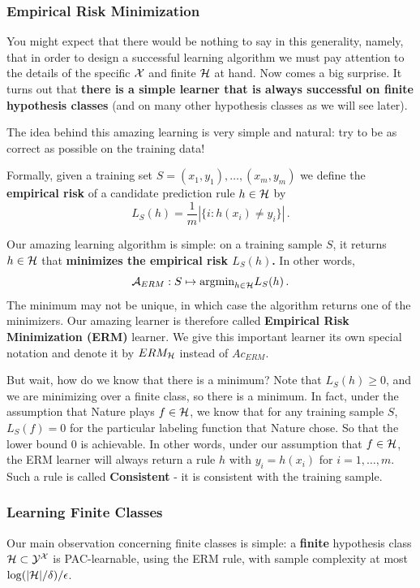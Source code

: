 {\subsubsection{Empirical Risk Minimization}

You might expect that there would be nothing to say in this generality, namely,
that in order to design a successful learning algorithm we must pay attention to
the details of the specific $\mathcal{X}$ and finite $\mathcal{H}$ at hand.
Now comes a big surprise. It turns out that {\bf there is a simple learner that is always successful on finite hypothesis classes} (and on many other hypothesis classes as we will see later).

The idea behind this amazing learning is very simple and natural: try to be as correct as possible on the training data!

Formally, given  a training set $S = (x_1,y_1),\ldots,(x_m,y_m)$ we define the {\bf empirical risk} of a candidate prediction rule $h\in\mathcal{H}$ by
$$L_S(h) = \frac{1}{m} |\{i : h(x_i)  \neq y_i\}|\,.$$

Our amazing learning algorithm is simple: on a training sample $S$, it returns $h \in \mathcal{H}$ that {\bf minimizes the empirical risk $L_S(h)$.} In other words,
\[
\mathcal{A}_{ERM} : S \mapsto \text{argmin}_{h\in\mathcal{H}} L_S(h)\,.
\]
The minimum may not be unique, in which case the algorithm returns one of the minimizers. Our amazing learner is therefore called \textbf{Empirical Risk Minimization (ERM)} learner. We give this important learner its own special notation and denote it by $ERM_{\mathcal{H}}$ instead of $Ac_{ERM}$.

But wait, how do we know that there is a minimum?  Note that $L_S(h)\geq 0$, and we are minimizing over a finite class, so there is a minimum. In fact, under the assumption that Nature plays $f\in\mathcal{H}$, we know that for any training sample $S$,  $L_S(f) = 0$ for the particular labeling function that Nature chose. So that the lower bound $0$ is achievable. In other words, under our assumption that $f\in\mathcal{H}$, the ERM learner will always return a rule  $h$ with $y_i = h(x_i)$ for $i=1,\ldots,m$. 
Such a rule is called \textbf{Consistent} - it is consistent with the training sample. 


\subsubsection{Learning Finite Classes}

Our main observation concerning finite classes is simple: a {\bf finite} hypothesis
class $\mathcal{H}\subset\mathcal{Y} ^{\mathcal{X}}$ is PAC-learnable, using the ERM rule,
with sample complexity at most 
$\log(|\mathcal{H}|/\delta)/\epsilon$.

}
